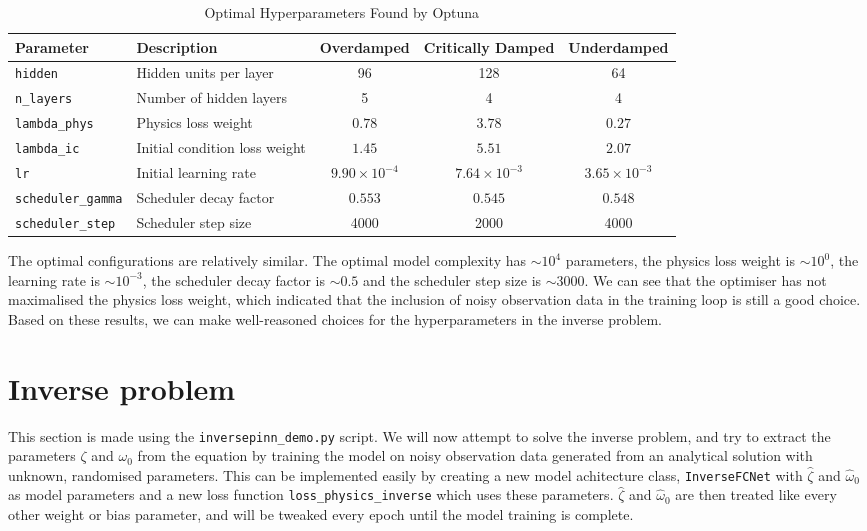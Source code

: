 \documentclass[we,twoside,openright,a4paper,11pt]{uantwerpenbamathesis}
\begin{document}
\begin{table}[H]
\centering
\caption{Optimal Hyperparameters Found by Optuna}\label{tab:optuna_best_params}
\begin{tabular}{llccc}
\toprule
\textbf{Parameter} & \textbf{Description} & \textbf{Overdamped} & \textbf{Critically Damped} & \textbf{Underdamped} \\
\midrule
\texttt{hidden}           & Hidden units per layer        & 96     & 128    & 64     \\
\texttt{n\_layers}        & Number of hidden layers       & 5      & 4      & 4      \\
\texttt{lambda\_phys}     & Physics loss weight           & $0.78$ & $3.78$ & $0.27$ \\
\texttt{lambda\_ic}       & Initial condition loss weight & $1.45$ & $5.51$ & $2.07$ \\
\texttt{lr}               & Initial learning rate         & $9.90\times10^{-4}$ & $7.64\times10^{-3}$ & $3.65\times10^{-3}$ \\
\texttt{scheduler\_gamma} & Scheduler decay factor        & $0.553$ & $0.545$ & $0.548$ \\
\texttt{scheduler\_step}  & Scheduler step size           & 4000   & 2000   & 4000   \\
\bottomrule
\end{tabular}
\end{table}
The optimal configurations are relatively similar. The optimal model complexity has $\sim10^4$ parameters, the physics loss weight is $\sim10^0$, the learning rate is $\sim10^{-3}$, the scheduler decay factor is $\sim0.5$ and the scheduler step size is $\sim3000$. We can see that the optimiser has not maximalised the physics loss weight, which indicated that the inclusion of noisy observation data in the training loop is still a good choice. Based on these results, we can make well-reasoned choices for the hyperparameters in the inverse problem.
\section{Inverse problem}\label{ch:inverse_DHO}
This section is made using the \verb|inversepinn_demo.py| script. We will now attempt to solve the inverse problem, and try to extract the parameters $\zeta$ and $\omega_0$ from the equation by training the model on noisy observation data generated from an analytical solution with unknown, randomised parameters. This can be implemented easily by creating a new model achitecture class, \verb|InverseFCNet| with $\hat\zeta$ and $\hat\omega_0$ as model parameters and a new loss function \verb|loss_physics_inverse| which uses these parameters. $\hat\zeta$ and $\hat\omega_0$ are then treated like every other weight or bias parameter, and will be tweaked every epoch until the model training is complete.\\
\end{document}
